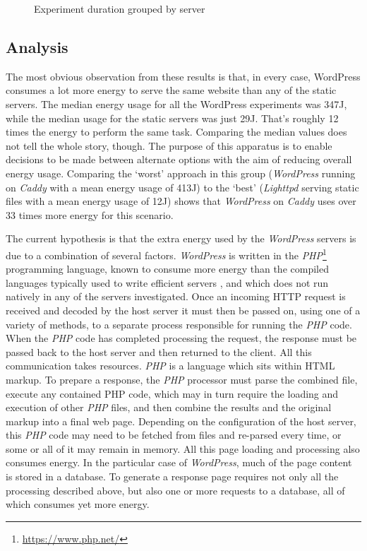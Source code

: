 \begin{figure}[htbp]
  \centering
  
  \caption{Experiment duration grouped by server}
  \label{Server Time}
\end{figure}

\subsection{Analysis}

The most obvious observation from these results is that, in every case, WordPress consumes a lot more energy to serve the same website than any of the static servers. The median energy usage for all the WordPress experiments was 347J, while the median usage for the static servers was just 29J. That's roughly 12 times the energy to perform the same task. Comparing the median values does not tell the whole story, though. The purpose of this apparatus is to enable decisions to be made between alternate options with the aim of reducing overall energy usage. Comparing the `worst' approach in this group (\emph{WordPress} running on \emph{Caddy} with a mean energy usage of 413J) to the `best' (\emph{Lighttpd} serving static files with a mean energy usage of 12J) shows that \emph{WordPress} on \emph{Caddy} uses over 33 times more energy for this scenario.

The current hypothesis is that the extra energy used by the \emph{WordPress} servers is due to a combination of several factors. \emph{WordPress} is written in the \emph{PHP}\footnote{\url{https://www.php.net/}} programming language, known to consume more energy than the compiled languages typically used to write efficient servers \citep{Pereira2017} \citep{Pereira2021}, and which does not run natively in any of the servers investigated. Once an incoming HTTP request is received and decoded by the host server it must then be passed on, using one of a variety of methods, to a separate process responsible for running the \emph{PHP} code. When the \emph{PHP} code has completed processing the request, the response must be passed back to the host server and then returned to the client. All this communication takes resources. \emph{PHP} is a language which sits within HTML markup. To prepare a response, the \emph{PHP} processor must parse the combined file, execute any contained PHP code, which may in turn require the loading and execution of other \emph{PHP} files, and then combine the results and the original markup into a final web page. Depending on the configuration of the host server, this \emph{PHP} code may need to be fetched from files and re-parsed every time, or some or all of it may remain in memory. All this page loading and processing also consumes energy. In the particular case of \emph{WordPress}, much of the page content is stored in a database. To generate a response page requires not only all the processing described above, but also one or more requests to a database, all of which consumes yet more energy.

